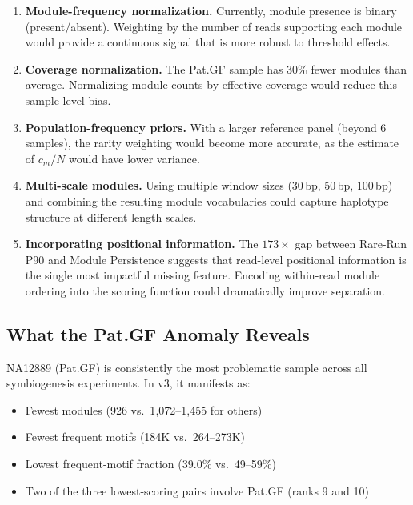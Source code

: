 \documentclass{../yalumba}
\begin{document}
\begin{enumerate}
  \item \textbf{Module-frequency normalization.}  Currently, module presence
        is binary (present/absent).  Weighting by the number of reads
        supporting each module would provide a continuous signal that is
        more robust to threshold effects.

  \item \textbf{Coverage normalization.}  The Pat.GF sample has 30\% fewer
        modules than average.  Normalizing module counts by effective coverage
        would reduce this sample-level bias.

  \item \textbf{Population-frequency priors.}  With a larger reference panel
        (beyond 6 samples), the rarity weighting would become more accurate,
        as the estimate of $c_m / N$ would have lower variance.

  \item \textbf{Multi-scale modules.}  Using multiple window sizes (30\,bp,
        50\,bp, 100\,bp) and combining the resulting module vocabularies could
        capture haplotype structure at different length scales.

  \item \textbf{Incorporating positional information.}  The $173\times$
        gap between Rare-Run P90 and Module Persistence suggests that
        read-level positional information is the single most impactful
        missing feature.  Encoding within-read module ordering into the
        scoring function could dramatically improve separation.
\end{enumerate}

\subsection{What the Pat.GF Anomaly Reveals}

NA12889 (Pat.GF) is consistently the most problematic sample across all
symbiogenesis experiments.  In v3, it manifests as:

\begin{itemize}
  \item Fewest modules (926 vs.\ 1{,}072--1{,}455 for others)
  \item Fewest frequent motifs (184K vs.\ 264--273K)
  \item Lowest frequent-motif fraction (39.0\% vs.\ 49--59\%)
  \item Two of the three lowest-scoring pairs involve Pat.GF (ranks 9 and 10)
\end{itemize}
\end{document}
